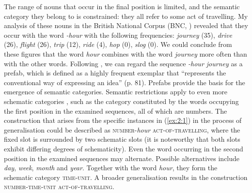 \noindent The range of nouns that occur in the final position is limited, and the semantic category they belong to is constrained: they all refer to some act of travelling. My analysis of these nouns in the British National Corpus (BNC, \mbox{\citealt{bnc})} revealed that they occur with the word \textit{-hour} with the following frequencies: \textit{journey} (35), \textit{drive} (26), \textit{flight} (26), \textit{trip} (12), \textit{ride} (4), \textit{hop} (0), \textit{slog} (0). We could conclude from these figures that the word \textit{hour} combines with the word \textit{journey} more often than with the other words. Following \citet{bybee-book-2010}, we can regard the sequence \textit{-hour journey} as a prefab, which is defined as a highly frequent exemplar that ``represents the conventional way of expressing an idea'' (p. 81). Prefabs provide the basis for the emergence of semantic categories. Semantic restrictions apply to even more schematic categories \citep[cf.][81]{bybee-book-2010}, such as the category constituted by the words occupying the first position in the examined sequences, all of which are numbers. The construction that arises from the specific instances in (\ref{ex:2:1}) in the process of generalisation could be described as \textsc{number}-\textit{hour} \textsc{act-of-travelling}, where the fixed slot is surrounded by two schematic slots (it is noteworthy that both slots exhibit differing degrees of schematicity). Even the word occurring in the second position in the examined sequences may alternate. Possible alternatives include \textit{day}, \textit{week}, \textit{month} and \textit{year}. Together with the word \textit{hour}, they form the schematic category \textsc{time-unit}. A broader generalisation results in the construction \textsc{number-time-unit act-of-travelling}. 

